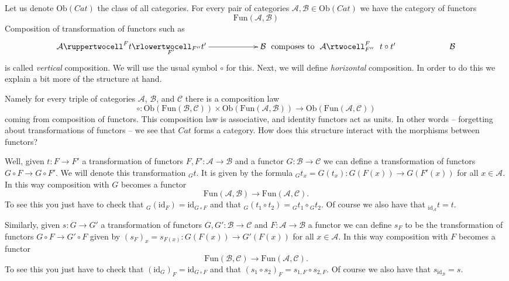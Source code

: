 \documentclass{amsart}
\theoremstyle{definition}
\theoremstyle{remark}
\numberwithin{equation}{subsection}
\begin{document}
\medskip\noindent
Let us denote $\text{Ob}(\textit{Cat})$ the class of all categories.
For every pair of categories
$\mathcal{A}, \mathcal{B} \in \text{Ob}(\textit{Cat})$
we have the category of functors
$$
\text{Fun}(\mathcal{A}, \mathcal{B})
$$
Composition of transformation of functors 
such as
$$
\xymatrixcolsep{5pc}
\xymatrix{
\mathcal{A}
\ruppertwocell^F{t}
\ar[r]_(.3){F'}
\rlowertwocell_{F''}{t'}
&
\mathcal{B}
}
\text{ composes to }
\xymatrix{
\mathcal{A}
\rtwocell^F_{F''}{\ \ t \circ t'}
&
\mathcal{B}
}
$$
is called {\it vertical} composition. We will use the usual
symbol $\circ$ for this. Next, we will define {\it horizontal}
composition. In order to do this we explain a bit more 
of the structure at hand.

\medskip\noindent
Namely for every triple
of categories $\mathcal{A}$, $\mathcal{B}$, and $\mathcal{C}$
there is a composition law
$$
\circ : \text{Ob}(\text{Fun}(\mathcal{B}, \mathcal{C}))
\times 
\text{Ob}(\text{Fun}(\mathcal{A}, \mathcal{B}))
\longrightarrow
\text{Ob}(\text{Fun}(\mathcal{A}, \mathcal{C}))
$$
coming from composition of functors. This composition law
is associative, and identity functors act as units. In other
words -- forgetting about transformations of functors --
we see that $\textit{Cat}$ forms a category. How does
this structure interact with the morphisms between functors?

\medskip\noindent
Well, given $t : F \to F'$ a transformation of
functors $F, F' : \mathcal{A} \to \mathcal{B}$ and
a functor
$G : \mathcal{B} \to \mathcal{C}$ we can define
a transformation of functors
$G\circ F \to G \circ F'$. We will denote this
transformation ${}_Gt$. It is given by the formula
${}_Gt_x = G(t_x) : G(F(x)) \to G(F'(x))$
for all $x \in \mathcal{A}$. 
In this way composition
with $G$ becomes a functor
$$
\text{Fun}(\mathcal{A}, \mathcal{B})
\longrightarrow
\text{Fun}(\mathcal{A}, \mathcal{C}).
$$
To see this you just have to check that
${}_G(\text{id}_F) = \text{id}_{G \circ F}$ and that
${}_G(t_1 \circ t_2) = {}_Gt_1 \circ {}_Gt_2$.
Of course we also have that ${}_{\text{id}_{\mathcal{A}}}t = t$.

\medskip\noindent
Similarly, given $s : G \to G'$ a transformation of
functors $G, G' : \mathcal{B} \to \mathcal{C}$ and
$F : \mathcal{A} \to \mathcal{B}$ a functor we can define
$s_F$ to be the transformation of functors
$G\circ F \to G' \circ F$ given by
$(s_F)_x = s_{F(x)} : G(F(x)) \to G'(F(x))$
for all $x \in \mathcal{A}$. In this way
composition with $F$ becomes a functor
$$
\text{Fun}(\mathcal{B}, \mathcal{C})
\longrightarrow
\text{Fun}(\mathcal{A}, \mathcal{C}).
$$
To see this you just have to check that
$(\text{id}_G)_F = \text{id}_{G\circ F}$ and that
$(s_1 \circ s_2)_F = s_{1,F} \circ s_{2,F}$.
Of course we also have that $s_{\text{id}_{\mathcal{B}}} = s$.
\end{document}
